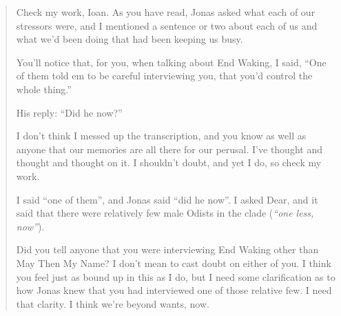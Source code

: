 \begin{quote}
Check my work, Ioan. As you have read, Jonas asked what each of our stressors were, and I mentioned a sentence or two about each of us and what we'd been doing that had been keeping us busy.

You'll notice that, for you, when talking about End Waking, I said, ``One of them told em to be careful interviewing you, that you'd control the whole thing.''

His reply: ``Did he now?''

I don't think I messed up the transcription, and you know as well as anyone that our memories are all there for our perusal. I've thought and thought and thought on it. I shouldn't doubt, and yet I do, so check my work.

I said ``one of them'', and Jonas said ``did he now''. I asked Dear, and it said that there were relatively few male Odists in the clade (\emph{``one less, now''}).

Did you tell anyone that you were interviewing End Waking other than May Then My Name? I don't mean to cast doubt on either of you. I think you feel just as bound up in this as I do, but I need some clarification as to how Jonas knew that you had interviewed one of those relative few. I need that clarity. I think we're beyond wants, now.
\end{quote}
